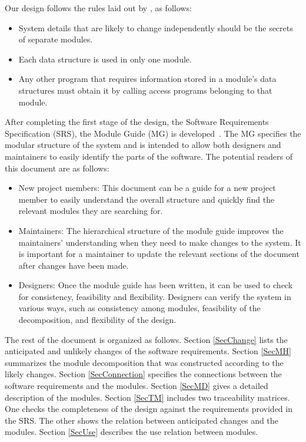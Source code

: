 \documentclass[12pt]{article}
\begin{document}
Our design follows the rules laid out by \citet{ParnasEtAl1984}, as follows:
\begin{itemize}
\item System details that are likely to change independently should be the
  secrets of separate modules.
\item Each data structure is used in only one module.
\item Any other program that requires information stored in a module's data
  structures must obtain it by calling access programs belonging to that module.
\end{itemize}

\noindent After completing the first stage of the design, the Software Requirements
Specification (SRS), the Module Guide (MG) is developed~\citep{ParnasEtAl1984}. The MG
specifies the modular structure of the system and is intended to allow both
designers and maintainers to easily identify the parts of the software.  The
potential readers of this document are as follows:

\begin{itemize}
\item New project members: This document can be a guide for a new project member
  to easily understand the overall structure and quickly find the
  relevant modules they are searching for.
\item Maintainers: The hierarchical structure of the module guide improves the
  maintainers' understanding when they need to make changes to the system. It is
  important for a maintainer to update the relevant sections of the document
  after changes have been made.
\item Designers: Once the module guide has been written, it can be used to
  check for consistency, feasibility and flexibility. Designers can verify the
  system in various ways, such as consistency among modules, feasibility of the
  decomposition, and flexibility of the design.
\end{itemize}

\noindent The rest of the document is organized as follows. Section
\ref{SecChange} lists the anticipated and unlikely changes of the software
requirements. Section \ref{SecMH} summarizes the module decomposition that
was constructed according to the likely changes. Section \ref{SecConnection}
specifies the connections between the software requirements and the
modules. Section \ref{SecMD} gives a detailed description of the
modules. Section \ref{SecTM} includes two traceability matrices. One checks
the completeness of the design against the requirements provided in the SRS. The
other shows the relation between anticipated changes and the modules. Section
\ref{SecUse} describes the use relation between modules.
\end{document}
